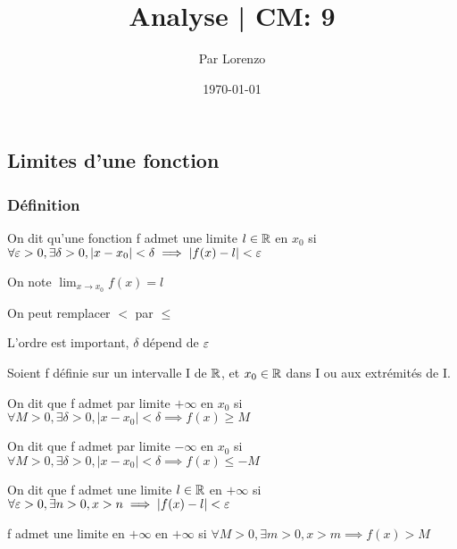 \documentclass[a4paper, 12pt]{article}
\title{Analyse | CM: 9}
\author{Par Lorenzo}
\date{\today}
\begin{document}
\maketitle

\subsection{Limites d'une fonction}

\subsubsection{Définition}

\begin{definition}
    On dit qu'une fonction f admet une limite $l \in \mathbb{R}$ en $x_0$ si $\forall \varepsilon > 0, \exists \delta > 0, |x - x_0| < \delta \implies |f(x) - l| < \varepsilon$

    On note $\lim_{x \to x_0} f(x) = l$
\end{definition}

\begin{remark}
    \item On peut remplacer $\lt$ par $\leq$
    \item L'ordre est important, $\delta$ dépend de $\varepsilon$
\end{remark}

\begin{definition}
    Soient f définie sur un intervalle I de $\mathbb{R}$, et $x_0 \in \mathbb{R}$ dans I ou aux extrémités de I.

    \item On dit que f admet par limite $+\infty$ en $x_0$ si $\forall M \gt 0, \exists \delta \gt 0, |x - x_0| \lt \delta \implies f(x) \geq M$
    \item On dit que f admet par limite $-\infty$ en $x_0$ si $\forall M \gt 0, \exists \delta \gt 0, |x - x_0| \lt \delta \implies f(x) \leq -M$
\end{definition}

\begin{definition}
    On dit que f admet une limite $l \in \mathbb{R}$ en $+\infty$ si $\forall \varepsilon > 0, \exists n > 0, x > n \implies |f(x) - l| < \varepsilon$
\end{definition}

\begin{definition}
    f admet une limite en $+\infty$ en $+\infty$ si $\forall M \gt 0, \exists m \gt 0, x \gt m \implies f(x) \gt M$
\end{definition}
\end{document}
